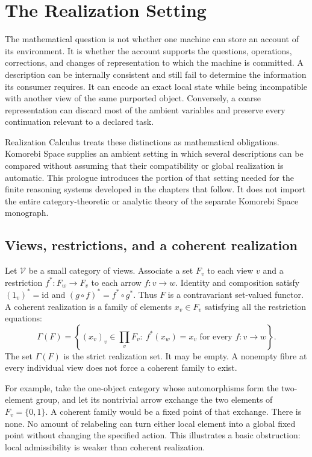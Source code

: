 \renewcommand{\thetheorem}{R.\arabic{theorem}}
\chapter*{The Realization Setting}

The mathematical question is not whether one machine can store an account of its environment. It is whether the account supports the questions, operations, corrections, and changes of representation to which the machine is committed. A description can be internally consistent and still fail to determine the information its consumer requires. It can encode an exact local state while being incompatible with another view of the same purported object. Conversely, a coarse representation can discard most of the ambient variables and preserve every continuation relevant to a declared task.

Realization Calculus treats these distinctions as mathematical obligations. Komorebi Space supplies an ambient setting in which several descriptions can be compared without assuming that their compatibility or global realization is automatic. This prologue introduces the portion of that setting needed for the finite reasoning systems developed in the chapters that follow. It does not import the entire category-theoretic or analytic theory of the separate Komorebi Space monograph.

\section*{Views, restrictions, and a coherent realization}
Let $\mathcal V$ be a small category of views. Associate a set $F_v$ to each view $v$ and a restriction $f^*:F_w\to F_v$ to each arrow $f:v\to w$. Identity and composition satisfy $(1_v)^*=\mathrm{id}$ and $(g\circ f)^*=f^*\circ g^*$. Thus $F$ is a contravariant set-valued functor. A coherent realization is a family of elements $x_v\in F_v$ satisfying all the restriction equations:
\[
\Gamma(F)=\left\{(x_v)_v\in\prod_v F_v:\ f^*(x_w)=x_v\text{ for every }f:v\to w\right\}.
\]
The set $\Gamma(F)$ is the strict realization set. It may be empty. A nonempty fibre at every individual view does not force a coherent family to exist.

For example, take the one-object category whose automorphisms form the two-element group, and let its nontrivial arrow exchange the two elements of $F_v=\{0,1\}$. A coherent family would be a fixed point of that exchange. There is none. No amount of relabeling can turn either local element into a global fixed point without changing the specified action. This illustrates a basic obstruction: local admissibility is weaker than coherent realization.

